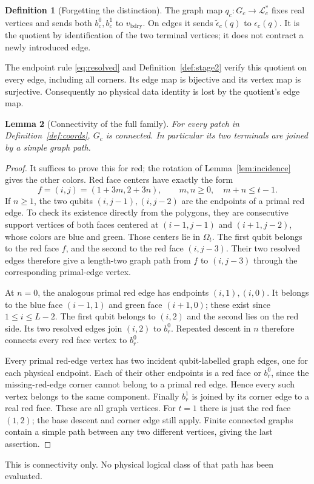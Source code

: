 \documentclass[11pt]{article}
\theoremstyle{definition}
\newtheorem{definition}{Definition}[section]
\theoremstyle{plain}
\newtheorem{lemma}[definition]{Lemma}
\theoremstyle{remark}
\newcommand{\LL}{\mathcal L}
\newcommand{\bd}{v_{\mathrm{bdry}}}
\newcommand{\eps}{\epsilon}
\begin{document}
\begin{definition}[Forgetting the distinction]\label{def:quotient}
The graph map $q_c:G_c\to\LL_c^*$ fixes real vertices and sends both
$b_c^0,b_c^1$ to $\bd$. On edges it sends
$\widetilde\eps_c(q)$ to $\eps_c(q)$.
It is the quotient by identification of the two terminal vertices;
it does not contract a newly introduced edge.
\end{definition}
The endpoint rule \eqref{eq:resolved} and Definition~\ref{def:stage2}
verify this quotient on every edge, including all corners.
Its edge map is bijective and its vertex map is surjective.
Consequently no physical data identity is lost by the quotient's edge map.

\begin{lemma}[Connectivity of the full family]
\label{lem:connected}
For every patch in Definition~\ref{def:coords}, $G_c$ is connected.
In particular its two terminals are joined by a simple graph path.
\end{lemma}
\begin{proof}
It suffices to prove this for red; the rotation of
Lemma~\ref{lem:incidence} gives the other colors.
Red face centers have exactly the form
\[
 f=(i,j)=(1+3m,2+3n),\qquad m,n\geq0,\quad m+n\leq t-1 .
\]
If $n\geq1$, the two qubits $(i,j-1),(i,j-2)$ are the endpoints
of a primal red edge. To check its existence directly from the polygons,
they are consecutive support vertices of both faces centered at
$(i-1,j-1)$ and $(i+1,j-2)$, whose colors are blue and green.
Those centers lie in $\Omega_t$. The first qubit belongs to the red
face $f$, and the second to the red face $(i,j-3)$. Their two resolved
edges therefore give a length-two graph path from $f$ to $(i,j-3)$
through the corresponding primal-edge vertex.

At $n=0$, the analogous primal red edge has endpoints $(i,1),(i,0)$.
It belongs to the blue face $(i-1,1)$ and green face $(i+1,0)$;
these exist since $1\leq i\leq L-2$. The first qubit belongs to
$(i,2)$ and the second lies on the red side. Its two resolved edges
join $(i,2)$ to $b_r^0$. Repeated descent in $n$ therefore connects
every red face vertex to $b_r^0$.

Every primal red-edge vertex has two incident qubit-labelled graph
edges, one for each physical endpoint. Each of their other endpoints
is a red face or $b_r^0$, since the missing-red-edge corner cannot
belong to a primal red edge. Hence every such vertex belongs to the
same component. Finally $b_r^1$ is joined by its corner edge to a
real red face. These are all graph vertices.
For $t=1$ there is just the red face $(1,2)$; the base descent and
corner edge still apply. Finite connected graphs contain a simple
path between any two different vertices, giving the last assertion.
\end{proof}
This is connectivity only. No physical logical class of that path has
been evaluated.
\end{document}
